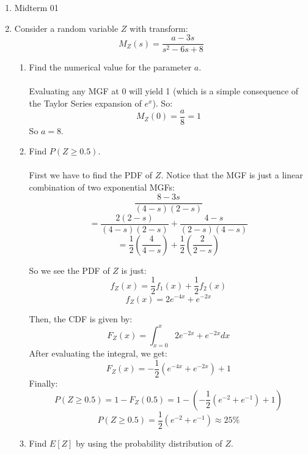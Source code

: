 
\usepackage{amsmath, dsfont}

\oddsidemargin 0in
\evensidemargin 0in
\textwidth 6.5in
\topmargin -0.5in
\textheight 9.0in
\newcommand{\norm}[1]{\left\lVert #1 \right\rVert}
\newcommand{\abs}[1]{\left\vert #1 \right\vert}
\newcommand{\?}{\stackrel{?}{=}}
\newcommand\given[1][]{\:#1\vert\:}
\renewcommand{\d}[1]{\ensuremath{\operatorname{d}\!{#1}}}



\pagestyle{myheadings}

\begin{enumerate}
  \item Midterm 01
  \item Consider a random variable $Z$ with transform:
    $$M_Z(s) = \frac{a-3s}{s^2-6s+8}$$
    \begin{enumerate}
      \item Find the numerical value for the parameter $a$.\\\\

        Evaluating any MGF at 0 will yield 1 (which is a simple consequence of the Taylor Series expansion of $e^x$). So:
        $$M_Z(0) = \frac{a}{8} = 1$$
        So $a = 8$.\\

      \item Find $P(Z \geq 0.5)$.\\\\

        First we have to find the PDF of $Z$. Notice that the MGF is just a linear combination of two exponential MGFs:
        $$\frac{8-3s}{(4-s)(2-s)}$$
        $$=\frac{2(2-s)}{(4-s)(2-s)} + \frac{4-s}{(2-s)(4-s)}$$
        $$=\frac{1}{2}(\frac{4}{4-s}) + \frac{1}{2}(\frac{2}{2-s})$$
        
        So we see the PDF of $Z$ is just:
        $$f_Z(x) = \frac{1}{2}f_1(x) + \frac{1}{2}f_2(x)$$
        $$f_Z(x) = 2e^{-4x} + e^{-2x}$$
        
        Then, the CDF is given by:
        $$F_Z(x) = \int_{x=0}^x 2e^{-2x} + e^{-2x} dx$$
        After evaluating the integral, we get:
        $$F_Z(x) = -\frac{1}{2}(e^{-4x} + e^{-2x}) + 1$$
        Finally:
        $$P(Z \geq 0.5) = 1 - F_Z(0.5) = 1 - (-\frac{1}{2}(e^{-2} + e^{-1}) + 1)$$
        $$P(Z \geq 0.5) = \frac{1}{2}(e^{-2} + e^{-1}) \approx 25\%$$

      \item Find $E[Z]$ by using the probability distribution of $Z$.\\\\
        

\end{enumerate}
\end{enumerate}
